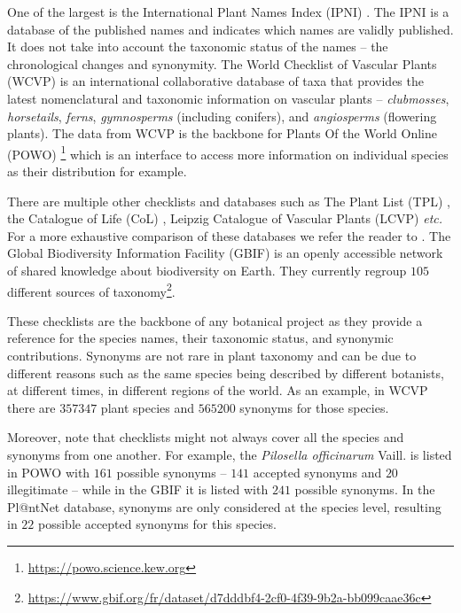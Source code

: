 One of the largest is the International Plant Names Index (IPNI) \citep{IPNI2024}.
The IPNI is a database of the published names and indicates which names are validly published.
It does not take into account the taxonomic status of the names -- the chronological changes and synonymity.
The World Checklist of Vascular Plants (WCVP) \citep{govaerts2021world} is an international collaborative database of taxa that provides the latest nomenclatural and taxonomic information on vascular plants -- \emph{clubmosses}, \emph{horsetails}, \emph{ferns}, \emph{gymnosperms} (including conifers), and \emph{angiosperms} (flowering plants).
The data from WCVP is the backbone for Plants Of the World Online (POWO) \footnote{\url{https://powo.science.kew.org}} which is an interface to access more information on individual species as their distribution for example.

There are multiple other checklists and databases such as The Plant List (TPL) \citep{PlantList2013}, the Catalogue of Life (CoL) \citep{cachuela2006towards}, Leipzig Catalogue of Vascular Plants (LCVP) \citep{freiberg2020leipzig} \emph{etc.} For a more exhaustive comparison of these databases we refer the reader to \citet{schellenberger2023big}.
The Global Biodiversity Information Facility (GBIF) \citep{telenius2011biodiversity} is an openly accessible network of shared knowledge about biodiversity on Earth.
They currently regroup $105$ different sources of taxonomy\footnote{\url{https://www.gbif.org/fr/dataset/d7dddbf4-2cf0-4f39-9b2a-bb099caae36c}}.

These checklists are the backbone of any botanical project as they provide a reference for the species names, their taxonomic status, and synonymic contributions.
Synonyms are not rare in plant taxonomy and can be due to different reasons such as the same species being described by different botanists, at different times, in different regions of the world.
As an example, in WCVP there are $357347$ plant species and $565200$ synonyms for those species.

Moreover, note that checklists might not always cover all the species and synonyms from one another.
For example, the \emph{Pilosella officinarum} Vaill. is listed in POWO with $161$ possible synonyms  -- $141$ accepted synonyms and $20$ illegitimate -- while in the GBIF it is listed with $241$ possible synonyms.
In the Pl@ntNet database, synonyms are only considered at the species level, resulting in $22$ possible accepted synonyms for this species.

